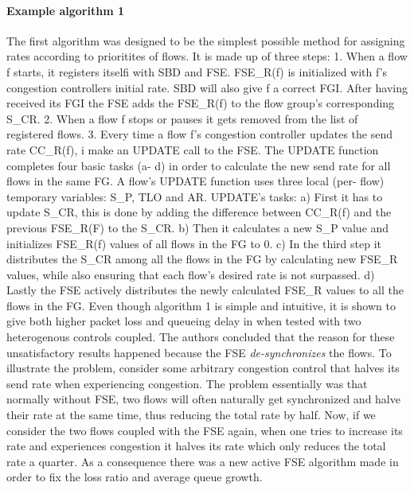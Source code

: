 \documentclass[UKenglish]{ifimaster}
\begin{document}
\paragraph{Example algorithm 1}
The first algorithm was designed to be the simplest possible method for assigning rates according to prioritites of flows. 
It is made up of three steps:
1. When a flow f starts, it registers itselfi with SBD and FSE. FSE\_R(f) is initialized with f's congestion controllers initial rate. 
SBD will also give f a correct FGI.
After having received its FGI the FSE adds the FSE\_R(f) to the flow group's corresponding S\_CR.
2. When a flow f stops or pauses it gets removed from the list of registered flows.
3. Every time a flow f's congestion controller updates the send rate CC\_R(f), i make an UPDATE call to the FSE.
The UPDATE function completes four basic tasks (a- d) in order to calculate the new send rate for all flows in the same FG.
A flow's UPDATE function uses three local (per- flow) temporary variables: S\_P, TLO and AR.
UPDATE's tasks:
a) First it has to update S\_CR, this is done by adding the difference between CC\_R(f) and the previous FSE\_R(F) to the S\_CR.
b) Then it calculates a new S\_P value and initializes FSE\_R(f) values of all flows in the FG to 0.
c) In the third step it distributes the S\_CR among all the flows in the FG by calculating new FSE\_R values, while also ensuring that each flow's desired rate is not surpassed.
d) Lastly the FSE actively distributes the newly calculated FSE\_R values to all the flows in the FG.
Even though algorithm 1 is simple and intuitive, it is shown to give both higher packet loss and queueing delay in \cite{10.1145/2740070.2630089} when tested with two heterogenous controls coupled. 
The authors concluded that the reason for these unsatisfactory results happened because the FSE \textit{de-synchronizes} the flows.
To illustrate the problem, consider some arbitrary congestion control that halves its send rate when experiencing congestion.
The problem essentially was that normally without FSE, two flows will often naturally get synchronized and halve their rate at the same time, thus reducing the total rate by half.
Now, if we consider the two flows coupled with the FSE again, when one tries to increase its rate and experiences congestion it halves its rate which only reduces the total rate a quarter.
As a consequence there was a new active FSE algorithm made in order to fix the loss ratio and average queue growth.
\end{document}
